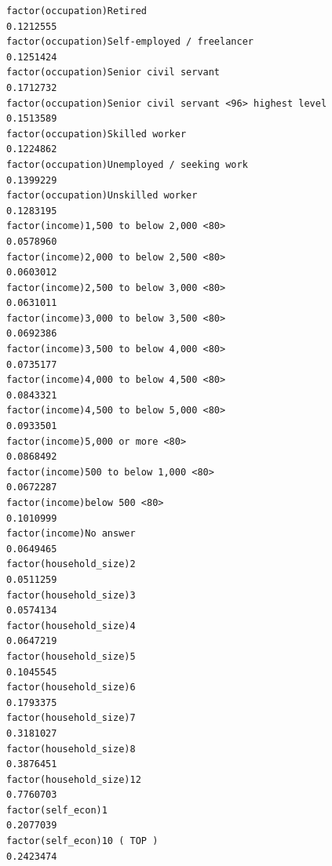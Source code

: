 \documentclass[
]{article}
\begin{document}
\begin{table}
\begin{minipage}[t]{\linewidth}
{\begin{verbatim}
factor(occupation)Retired                                                          0.1212555
factor(occupation)Self-employed / freelancer                                       0.1251424
factor(occupation)Senior civil servant                                             0.1712732
factor(occupation)Senior civil servant <96> highest level                          0.1513589
factor(occupation)Skilled worker                                                   0.1224862
factor(occupation)Unemployed / seeking work                                        0.1399229
factor(occupation)Unskilled worker                                                 0.1283195
factor(income)1,500 to below 2,000 <80>                                            0.0578960
factor(income)2,000 to below 2,500 <80>                                            0.0603012
factor(income)2,500 to below 3,000 <80>                                            0.0631011
factor(income)3,000 to below 3,500 <80>                                            0.0692386
factor(income)3,500 to below 4,000 <80>                                            0.0735177
factor(income)4,000 to below 4,500 <80>                                            0.0843321
factor(income)4,500 to below 5,000 <80>                                            0.0933501
factor(income)5,000 or more <80>                                                   0.0868492
factor(income)500 to below 1,000 <80>                                              0.0672287
factor(income)below 500 <80>                                                       0.1010999
factor(income)No answer                                                            0.0649465
factor(household_size)2                                                            0.0511259
factor(household_size)3                                                            0.0574134
factor(household_size)4                                                            0.0647219
factor(household_size)5                                                            0.1045545
factor(household_size)6                                                            0.1793375
factor(household_size)7                                                            0.3181027
factor(household_size)8                                                            0.3876451
factor(household_size)12                                                           0.7760703
factor(self_econ)1                                                                 0.2077039
factor(self_econ)10 ( TOP )                                                        0.2423474

\end{verbatim}}
\end{minipage}
\end{table}
\end{document}
